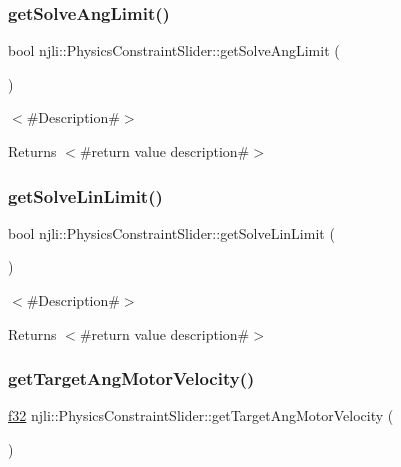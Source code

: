 \subsubsection{\texorpdfstring{get\+Solve\+Ang\+Limit()}{getSolveAngLimit()}}
{\footnotesize\ttfamily bool njli\+::\+Physics\+Constraint\+Slider\+::get\+Solve\+Ang\+Limit (\begin{DoxyParamCaption}{ }\end{DoxyParamCaption})}

$<$\#\+Description\#$>$

\begin{DoxyReturn}{Returns}
$<$\#return value description\#$>$ 
\end{DoxyReturn}
\mbox{\label{classnjli_1_1_physics_constraint_slider_a5a708d3b494cedca05791f188fd8c6e7}} 
\subsubsection{\texorpdfstring{get\+Solve\+Lin\+Limit()}{getSolveLinLimit()}}
{\footnotesize\ttfamily bool njli\+::\+Physics\+Constraint\+Slider\+::get\+Solve\+Lin\+Limit (\begin{DoxyParamCaption}{ }\end{DoxyParamCaption})}

$<$\#\+Description\#$>$

\begin{DoxyReturn}{Returns}
$<$\#return value description\#$>$ 
\end{DoxyReturn}
\mbox{\label{classnjli_1_1_physics_constraint_slider_a9f765345742e2ca1fd00a8bac20bc364}} 
\subsubsection{\texorpdfstring{get\+Target\+Ang\+Motor\+Velocity()}{getTargetAngMotorVelocity()}}
{\footnotesize\ttfamily \mbox{\hyperlink{_util_8h_a5f6906312a689f27d70e9d086649d3fd}{f32}} njli\+::\+Physics\+Constraint\+Slider\+::get\+Target\+Ang\+Motor\+Velocity (\begin{DoxyParamCaption}{ }\end{DoxyParamCaption})}

